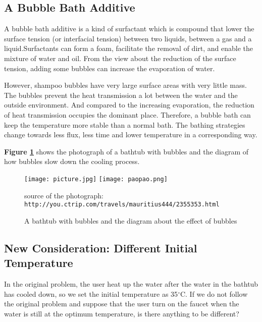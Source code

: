 \documentclass[12pt]{article}
\begin{document}
\subsection{A Bubble Bath Additive}
A bubble bath additive is a kind of surfactant which is compound that lower the surface tension (or
interfacial tension) between two liquids, between a gas and a liquid.Surfactants can form a foam,
facilitate the removal of dirt, and enable the mixture of water and oil. From the view about the
reduction of the surface tension, adding some bubbles can increase the evaporation of water.

However, shampoo bubbles have very large surface areas with very little mass. The bubbles prevent
the heat transmission a lot between the water and the outside environment. And compared to the
increasing evaporation, the reduction of heat transmission occupies the dominant place. Therefore, a
bubble bath can keep the temperature more stable than a normal bath. The bathing strategies change
towards less flux, less time and lower temperature in a corresponding way.

\textbf{Figure \ref{bubble}} shows the photograph of a bathtub with bubbles and the diagram of how
bubbles slow down the cooling process.
\begin{figure}[!htbp]
    \small
    \centering
    \texttt{[image: picture.jpg]}
    \texttt{[image: paopao.png]}
    \caption{A bathtub with bubbles and the diagram about the effect of bubbles}\label{bubble}
    source of the photograph: \texttt{http://you.ctrip.com/travels/mauritius444/2355353.html}
\end{figure}

\subsection{New Consideration: Different Initial Temperature}
In the original problem, the user heat up the water after the water in the bathtub has cooled down,
so we set the initial temperature as 35$^\circ$C. If we do not follow the original problem and
suppose that the user turn on the faucet when the water is still at the optimum temperature, is
there anything to be different?
\end{document}
